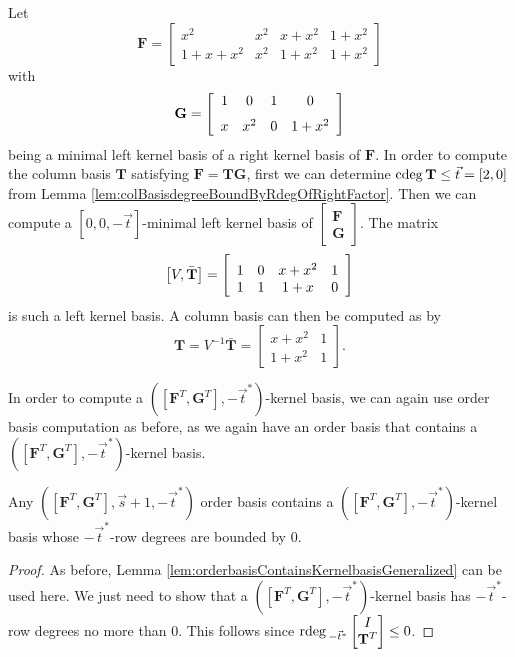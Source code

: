 \begin{exmp}
Let 
\[
\mathbf{F}=\left[\begin{array}{cccc}
x^{2} & x^{2} & x+x^{2} & 1+x^{2}\\
1+x+x^{2} & x^{2} & 1+x^{2} & 1+x^{2}
\end{array}\right]
\]
with 
\[
\mathbf{G}=\left[\begin{array}{cccc}
1 & 0 & 1 & 0\\
\noalign{\medskip}x & {x}^{2} & 0 & 1+{x}^{2}
\end{array}\right]
\]
being a minimal left kernel basis of a right kernel basis of $\mathbf{F}$.
In order to compute the column basis $\mathbf{T}$ satisfying $\mathbf{F}=\mathbf{T}\mathbf{G}$,
first we can determine ${\rm cdeg}\,\mathbf{T}\le\vec{t}=\left[2,0\right]$
from Lemma \ref{lem:colBasisdegreeBoundByRdegOfRightFactor}. Then
we can compute a $\left[0,0,-\vec{t}\right]$-minimal left kernel
basis of $\begin{bmatrix}\mathbf{F}\\
\mathbf{G}
\end{bmatrix}$. The matrix 
\[
\left[V,\bar{\mathbf{T}}\right]=\left[\begin{array}{cccc}
\noalign{\medskip}1 & 0 & x+{x}^{2} & 1\\
1 & 1 & 1+x & 0
\end{array}\right]
\]
is such a left kernel basis. A column basis can then be computed as
by 
\[
\mathbf{T}=V^{-1}\bar{\mathbf{T}}=\left[\begin{array}{cc}
x+x^{2} & 1\\
1+{x}^{2} & 1
\end{array}\right].
\]

\end{exmp}
In order to compute a $\left(\left[\mathbf{F}^{T},\mathbf{G}^{T}\right],-\vec{t}^{*}\right)$-kernel
basis, we can again use order basis computation as before, as we again
have an order basis that contains a $\left(\left[\mathbf{F}^{T},\mathbf{G}^{T}\right],-\vec{t}^{*}\right)$-kernel
basis.
\begin{lem}
Any $\left(\left[\mathbf{F}^{T},\mathbf{G}^{T}\right],\vec{s}+1,-\vec{t}^{*}\right)$
order basis contains a $\left(\left[\mathbf{F}^{T},\mathbf{G}^{T}\right],-\vec{t}^{*}\right)$-kernel
basis whose $-\vec{t}^{*}$-row degrees are bounded by 0. \end{lem}
\begin{proof}
As before, Lemma \ref{lem:orderbasisContainsKernelbasisGeneralized}
can be used here. We just need to show that a $\left(\left[\mathbf{F}^{T},\mathbf{G}^{T}\right],-\vec{t}^{*}\right)$-kernel
basis has $-\vec{t}^{*}$-row degrees no more than $0$. This follows
since ${\rm rdeg}\,_{-\vec{t}^{*}}\begin{bmatrix}I\\
\mathbf{T}^{T}
\end{bmatrix}\le0$. 
\end{proof}

